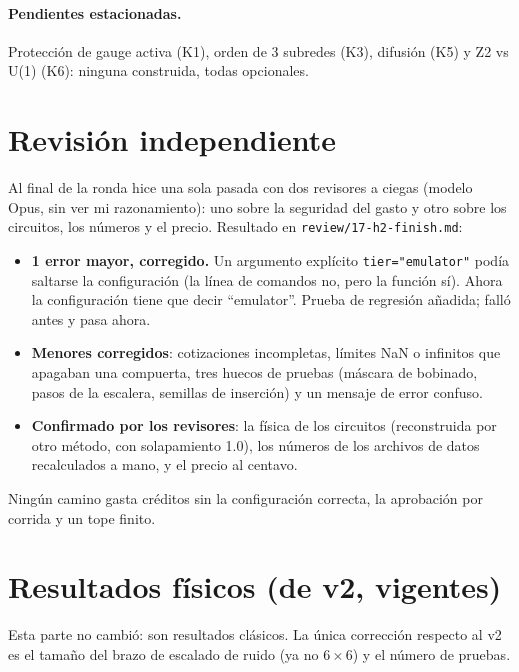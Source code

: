 \documentclass[11pt,a4paper]{article}
\newcommand{\code}[1]{\nolinkurl{#1}}
\begin{document}
\paragraph{Pendientes estacionadas.} Protecci\'on de gauge activa (K1), orden de 3 subredes (K3), difusi\'on (K5) y
Z2 vs U(1) (K6): ninguna construida, todas opcionales.

\section{Revisi\'on independiente}\label{sec:revision}
Al final de la ronda hice una sola pasada con dos revisores a ciegas (modelo Opus, sin ver mi razonamiento):
uno sobre la seguridad del gasto y otro sobre los circuitos, los n\'umeros y el precio. Resultado en
\code{review/17-h2-finish.md}:
\begin{itemize}[leftmargin=1.4em]
  \item \textbf{1 error mayor, corregido.} Un argumento expl\'icito \texttt{tier="emulator"} pod\'ia saltarse la
    configuraci\'on (la l\'inea de comandos no, pero la funci\'on s\'i). Ahora la configuraci\'on tiene que decir
    ``emulator''. Prueba de regresi\'on a\~nadida; fall\'o antes y pasa ahora.
  \item \textbf{Menores corregidos}: cotizaciones incompletas, l\'imites NaN o infinitos que apagaban una
    compuerta, tres huecos de pruebas (m\'ascara de bobinado, pasos de la escalera, semillas de inserci\'on) y un
    mensaje de error confuso.
  \item \textbf{Confirmado por los revisores}: la f\'isica de los circuitos (reconstruida por otro m\'etodo, con
    solapamiento 1.0), los n\'umeros de los archivos de datos recalculados a mano, y el precio al centavo.
\end{itemize}
Ning\'un camino gasta cr\'editos sin la configuraci\'on correcta, la aprobaci\'on por corrida y un tope finito.

\appendix

\section{Resultados f\'isicos (de v2, vigentes)}\label{ap:resultados}

Esta parte no cambi\'o: son resultados cl\'asicos. La \'unica correcci\'on respecto al v2 es el tama\~no del
brazo de escalado de ruido (ya no $6{\times}6$) y el n\'umero de pruebas.
\end{document}
